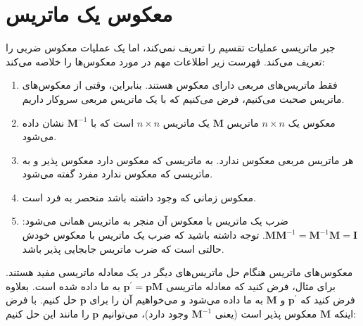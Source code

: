 \section{\textbf{معکوس یک ماتریس}}
\label{sec:2.7}
{
    \Large
    \begin{spacing}{1.5}
        جبر ماتریسی عملیات تقسیم را تعریف نمی‌کند، اما یک عملیات معکوس ضربی را تعریف می‌کند. فهرست زیر اطلاعات مهم در مورد معکوس‌ها را خلاصه می‌کند:

        \begin{enumerate}[label=\textbf{\arabic*}.]
            \item {فقط ماتریس‌های مربعی دارای معکوس هستند.
            بنابراین، وقتی از معکوس‌های ماتریس صحبت می‌کنیم، فرض می‌کنیم که با یک ماتریس مربعی سروکار داریم.}

            \item {معکوس یک $n\times n$ ماتریس $\textbf{M}$ یک ماتریس $n\times n$ است که با $\textbf{M}^{-1}$ نشان داده می‌شود.}

            \item {هر ماتریس مربعی معکوس ندارد.
            به ماتریسی که معکوس دارد معکوس پذیر و به ماتریسی که معکوس ندارد مفرد گفته می‌شود.}

            \item {معکوس زمانی که وجود داشته باشد منحصر به فرد است.}

            \item {ضرب یک ماتریس با معکوس آن منجر به ماتریس همانی می‌شود: $\textbf{M}\textbf{M}^{-1}=\textbf{M}^{-1}\textbf{M}=\textbf{I}$.
            توجه داشته باشید که ضرب یک ماتریس با معکوس خودش حالتی است که ضرب ماتریس جابجایی پذیر باشد.}
        \end{enumerate}

        معکوس‌های ماتریس هنگام حل ماتریس‌های دیگر در یک معادله ماتریسی مفید هستند.
        برای مثال، فرض کنید که معادله ماتریسی $\textbf{p}^{\prime}=\textbf{p}\textbf{M}$ به ما داده شده است.
        بعلاوه فرض کنید که $\textbf{p}^{\prime}$ و $\textbf{M}$ به ما داده می‌شود و می‌خواهیم آن را برای $\textbf{p}$ حل کنیم.
        با فرض اینکه $\textbf{M}$ معکوس پذیر است (یعنی $\textbf{M}^{-1}$ وجود دارد)، می‌توانیم $\textbf{p}$ را مانند این حل کنیم:

        \begin{flushleft}
        \end{flushleft}


\end{spacing}}

